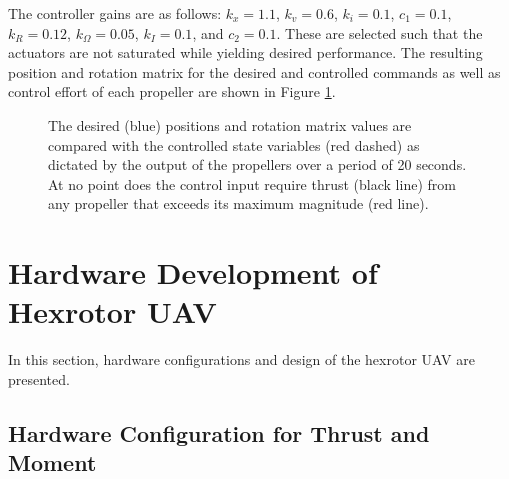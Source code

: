 \documentclass[twocolumn,letterpaper]{IEEEAerospaceCLS}  %
\begin{document}
The controller gains are as follows: $k_x=1.1$, $k_v=0.6$, $k_i=0.1$, $c_1=0.1$, $k_R=0.12$, $k_{\Omega}=0.05$, $k_I=0.1$, and $c_2=0.1$. These are selected such that the actuators are not saturated while yielding desired performance. The resulting position and rotation matrix for the desired and controlled commands as well as control effort of each propeller are shown in Figure \ref{fig:numSim}.

\begin{figure}
\centerline{
	}
\centerline{
	}
\centerline{
	}
\caption{The desired (blue) positions and rotation matrix values are compared with the controlled state variables (red dashed) as dictated by the output of the propellers over a period of 20 seconds. At no point does the control input require thrust (black line) from any propeller that exceeds its maximum magnitude (red line).}
\label{fig:numSim}
\end{figure}

		
\section{Hardware Development of Hexrotor UAV}\label{sec:Hardware}

In this section, hardware configurations and design of the hexrotor UAV are presented. 

\subsection{Hardware Configuration for Thrust and Moment}%

\end{document}

